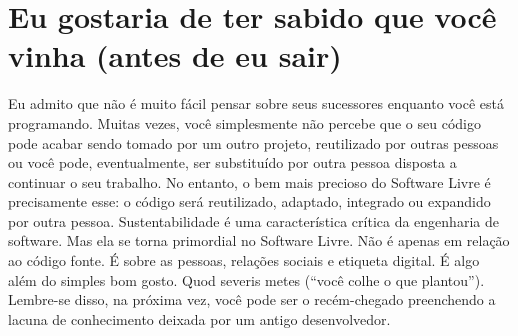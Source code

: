 \section*{Eu gostaria de ter sabido que você vinha (antes de eu sair)}

Eu admito que não é muito fácil pensar sobre seus sucessores enquanto você está programando. 
Muitas vezes, você simplesmente não percebe que o seu código pode acabar sendo tomado por um
outro projeto, reutilizado por outras pessoas ou você pode, eventualmente, ser substituído
por outra pessoa disposta a continuar o seu trabalho. No entanto, o bem mais precioso do
Software Livre é precisamente esse: o código será reutilizado, adaptado, integrado ou expandido
por outra pessoa. Sustentabilidade é uma característica crítica da engenharia de software.
Mas ela se torna primordial no Software Livre. Não é apenas em relação ao código fonte. 
É sobre as pessoas, relações sociais e etiqueta digital. É algo além do simples bom gosto.
Quod severis metes (``você colhe o que plantou''). Lembre-se disso, na próxima vez, você
pode ser o recém-chegado preenchendo a lacuna de conhecimento deixada por um antigo desenvolvedor.